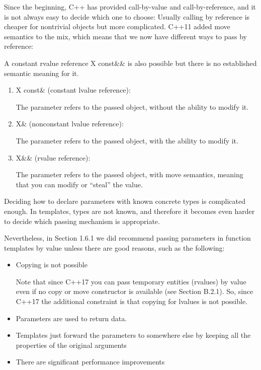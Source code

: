 Since the beginning, C++ has provided call-by-value and call-by-reference, and it is not always easy to decide which one to choose: Usually calling by reference is cheaper for nontrivial objects but more complicated. C++11 added move semantics to the mix, which means that we now have different ways to pass by reference:

\begin{tcolorbox}[colback=webgreen!5!white,colframe=webgreen!75!black]
\hspace*{0.75cm}A constant rvalue reference X const\&\& is also possible but there is no established semantic meaning for it.
\end{tcolorbox}

\begin{enumerate}
\item 
X const\& (constant lvalue reference):

The parameter refers to the passed object, without the ability to modify it.

\item 
X\& (nonconstant lvalue reference):

The parameter refers to the passed object, with the ability to modify it.

\item 
X\&\& (rvalue reference):

The parameter refers to the passed object, with move semantics, meaning that you can modify or “steal” the value.
\end{enumerate}

Deciding how to declare parameters with known concrete types is complicated enough. In templates, types are not known, and therefore it becomes even harder to decide which passing mechanism is appropriate.

Nevertheless, in Section 1.6.1 we did recommend passing parameters in function templates by value unless there are good reasons, such as the following:

\begin{itemize}
\item 
Copying is not possible

\begin{tcolorbox}[colback=webgreen!5!white,colframe=webgreen!75!black]
\hspace*{0.75cm}Note that since C++17 you can pass temporary entities (rvalues) by value even if no copy or move constructor is available (see Section B.2.1). So, since C++17 the additional constraint is that copying for lvalues is not possible.
\end{tcolorbox}

\item 
Parameters are used to return data.

\item 
Templates just forward the parameters to somewhere else by keeping all the properties of the original arguments

\item 
There are significant performance improvements
\end{itemize}

